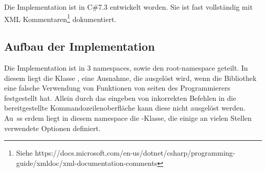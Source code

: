 Die Implementation ist in C\#7.3 entwickelt worden.
Sie ist fast vollständig mit XML Kommentaren\footnote{Siehe https://docs.microsoft.com/en-us/dotnet/csharp/programming-guide/xmldoc/xml-documentation-comments} dokumentiert.
\subsection{Aufbau der Implementation}\label{subsec:Architecture}
Die Implementation ist in 3 namespaces, sowie den root-namespace geteilt.
In diesem liegt die Klasse , eine Ausnahme, die ausgelöst wird, wenn die Bibliothek eine falsche Verwendung von Funktionen von seiten des Programmierers festgestellt hat.
Allein durch das eingeben von inkorrekten Befehlen in die bereitgestellte Kommandozeilenoberfläche kann diese nicht ausgelöst werden. Au\
 ss erdem liegt in diesem namespace die -Klasse, die einige an vielen Stellen verwendete Optionen definiert.
